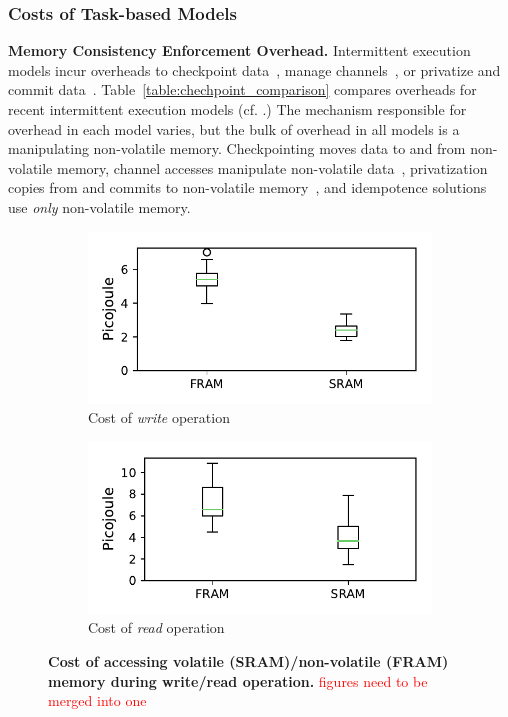 \subsubsection{Costs of Task-based Models}


\textbf{Memory Consistency Enforcement Overhead.} Intermittent execution models incur overheads to checkpoint data~\cite{dino,ratchet,quickrecall,mementos}, manage channels~\cite{chain}, or privatize and commit data~\cite{alpaca}. Table~\ref{table:chechpoint_comparison} compares overheads for recent intermittent execution models (cf. \cite[Sec. 2.4]{alpaca}.) The mechanism responsible for overhead in each model varies, but the bulk of overhead in all models is a manipulating non-volatile memory. Checkpointing moves data to and from non-volatile memory, channel accesses manipulate non-volatile data~\cite{chain}, privatization copies from and commits to non-volatile memory~\cite{alpaca}, and idempotence solutions~\cite{ratchet} use {\em only} non-volatile memory.  

\begin{figure}
\begin{subfigure}[t]{.49\columnwidth}
	\centering \includegraphics[width=\columnwidth]{figures/fram_write}
	\caption{Cost of \emph{write} operation}
\end{subfigure}%
\begin{subfigure}[t]{.49\columnwidth}
	\centering \includegraphics[width=\columnwidth]{figures/fram_read}
	\caption{Cost of \emph{read} operation}
\end{subfigure}
	\caption{\textbf{Cost of accessing volatile (SRAM)/non-volatile (FRAM) memory during write/read operation.} \textcolor{red}{figures need to be merged into one}}\label{fig:framEnergy}
\end{figure}

